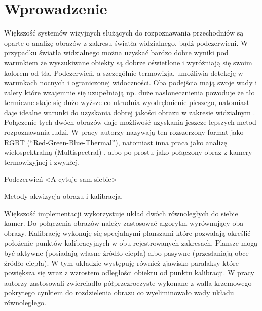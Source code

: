 \chapter{Wprowadzenie}
\label{cha:wprowadzenie}

Większość systemów wizyjnych służących do rozpoznawania przechodniów są oparte o analizę obrazów z zakresu światła widzialnego, bądź podczerwieni. W przypadku światła widzialnego można uzyskać bardzo dobre wyniki pod warunkiem że wyszukiwane obiekty są dobrze oświetlone i wyróżniają się swoim kolorem od tła. Podczerwień, a szczególnie termowizja, umożliwia detekcję w warunkach nocnych i ograniczonej widoczności. Oba podejścia mają swoje wady i zalety które wzajemnie się uzupełniają np. duże nasłonecznienia powoduje że tło termiczne staje się dużo wyższe co utrudnia wyodrębnienie pieszego, natomiast daje idealne warunki do uzyskania dobrej jakości obrazu w zakresie widzialnym \cite{lee2015robust}. Połączenie tych dwóch obrazów daje możliwość uzyskania jeszcze lepszych metod rozpoznawania ludzi. W pracy \cite{st2007combination} autorzy nazywają ten rozszerzony format jako RGBT (“Red-Green-Blue-Thermal”), natomiast inna praca jako analizę wielospektralną (Multispectral) \cite{hwang2015multispectral}, albo po prostu jako połączony obraz z kamery termowizyjnej i zwykłej\cite{lee2015robust}. 

Podczerwień
<A cytuje sam siebie>

Metody akwizycja obrazu i kalibracja.

Większość implementacji wykorzystuje układ dwóch równoległych do siebie kamer. Do połączenia obrazów należy zastosować algorytm wyrównujący oba obrazy. Kalibrację wykonuję się specjalnymi  planszami które pozwalają określić położenie punktów kalibracyjnych w obu rejestrowanych zakresach. Plansze mogą być aktywne (posiadają własne źródło ciepła) albo pasywne (przesłaniają obce źródło ciepła). W tym układzie występuję również zjawisko paralaksy które powiększa się wraz z wzrostem odległości obiektu od punktu kalibracji. W pracy  \cite{hwang2015multispectral} autorzy zastosowali zwierciadło półprzezroczyste wykonane z wafla krzemowego pokrytego cynkiem do rozdzielenia obrazu co wyeliminowało wady układu równoległego.

